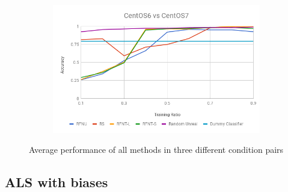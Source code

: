 \documentclass[10pt, conference, compsocconf]{IEEEtran}
\begin{document}
\begin{figure}[h!]
\begin{subfigure}[b]{0.4\linewidth}
        \end{subfigure}
        \begin{subfigure}[b]{0.4\linewidth}
                \includegraphics[width=\columnwidth]{figures/simple-methods-6vs7}
        \end{subfigure}
	\caption{Average performance of all methods in three different condition pairs}
	\label{fig:simple-methods}
\end{figure}
\subsection{ALS with biases}
\end{document}
